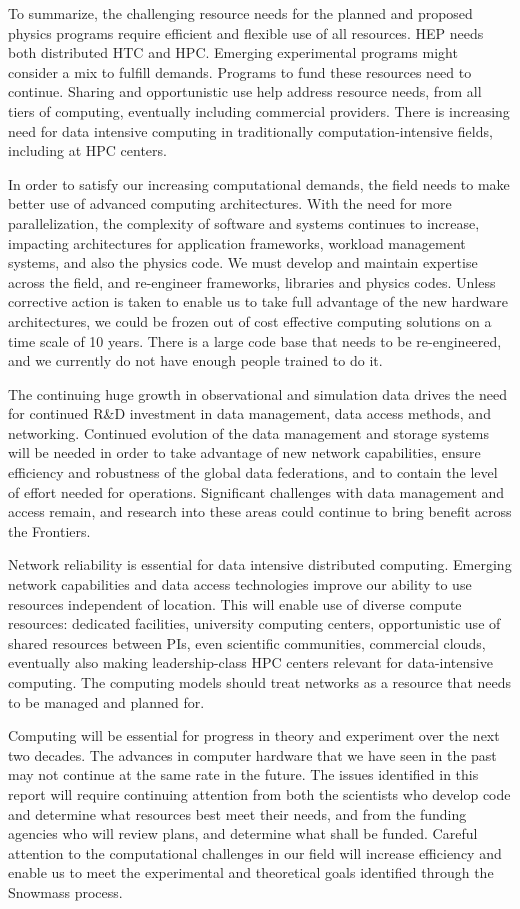To summarize, the challenging resource needs for the planned and proposed
physics programs require efficient and flexible use of all resources. HEP
needs both distributed HTC and HPC. Emerging experimental programs might
consider a mix to fulfill demands. Programs to fund these resources need to
continue. Sharing and opportunistic use help address resource needs, from
all tiers of computing, eventually including commercial providers. There is
increasing need for data intensive computing in traditionally
computation-intensive fields, including at HPC centers.  

In order to satisfy our increasing computational demands, the field needs
to make better use of advanced computing architectures. With the need for
more parallelization, the complexity of software and systems continues to
increase, impacting architectures for application frameworks, workload
management systems, and also the physics code. We must develop and maintain
expertise across the field, and re-engineer frameworks, libraries and
physics codes. Unless corrective action is taken to enable us to take full
advantage of the new hardware architectures, we could be frozen out of cost
effective computing solutions on a time scale of 10 years. There is a large
code base that needs to be re-engineered, and we currently do not have
enough people trained to do it.

The continuing huge growth in observational and simulation data drives the
need for continued R\&D investment in data management, data access methods,
and networking. Continued evolution of the data management and storage
systems will be needed in order to take advantage of new network
capabilities, ensure efficiency and robustness of the global data
federations, and to contain the level of effort needed for operations.
Significant challenges with data management and access remain, and research
into these areas could continue to bring benefit across the Frontiers.  

Network reliability is essential for data intensive distributed computing.
Emerging network capabilities and data access technologies improve our
ability to use resources independent of location. This will enable use of
diverse compute resources: dedicated facilities, university computing
centers, opportunistic use of shared resources between PIs, even scientific
communities, commercial clouds, eventually also making leadership-class HPC
centers relevant for data-intensive computing. The computing models should
treat networks as a resource that needs to be managed and planned for.

Computing will be essential for progress in theory and experiment over the
next two decades. 
The advances in computer hardware that we have seen
in the past may not continue at the same rate in the future. The issues
identified in this report will require continuing attention from both the
scientists who develop code and determine what resources best meet
their needs, and from the funding agencies who will review plans, and
determine what shall be funded.
Careful attention to the computational challenges in our field
will increase efficiency and enable us to meet the
experimental and theoretical goals identified through the Snowmass process.
